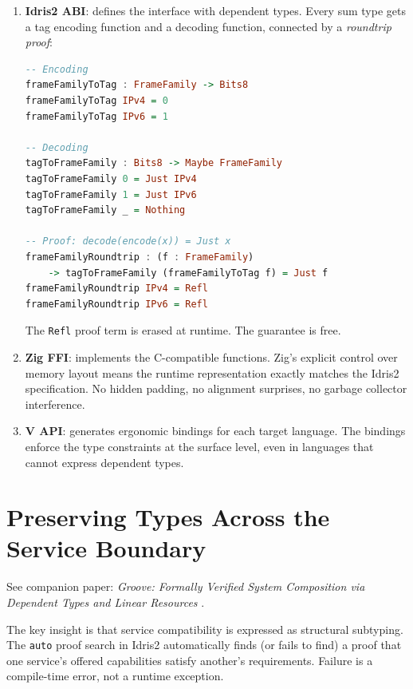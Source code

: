 \documentclass[11pt,a4paper]{article}
\begin{document}
\begin{enumerate}
\item \textbf{Idris2 ABI}: defines the interface with dependent types.
  Every sum type gets a tag encoding function and a decoding function,
  connected by a \emph{roundtrip proof}:

\begin{lstlisting}[language=Haskell]
-- Encoding
frameFamilyToTag : FrameFamily -> Bits8
frameFamilyToTag IPv4 = 0
frameFamilyToTag IPv6 = 1

-- Decoding
tagToFrameFamily : Bits8 -> Maybe FrameFamily
tagToFrameFamily 0 = Just IPv4
tagToFrameFamily 1 = Just IPv6
tagToFrameFamily _ = Nothing

-- Proof: decode(encode(x)) = Just x
frameFamilyRoundtrip : (f : FrameFamily)
    -> tagToFrameFamily (frameFamilyToTag f) = Just f
frameFamilyRoundtrip IPv4 = Refl
frameFamilyRoundtrip IPv6 = Refl
\end{lstlisting}

  The \texttt{Refl} proof term is erased at runtime. The guarantee is
  free.

\item \textbf{Zig FFI}: implements the C-compatible functions. Zig's
  explicit control over memory layout means the runtime representation
  exactly matches the Idris2 specification. No hidden padding, no
  alignment surprises, no garbage collector interference.

\item \textbf{V API}: generates ergonomic bindings for each target
  language. The bindings enforce the type constraints at the surface
  level, even in languages that cannot express dependent types.
\end{enumerate}

\section{Preserving Types Across the Service Boundary}
\label{sec:service}

See companion paper: \emph{Groove: Formally Verified System Composition
via Dependent Types and Linear Resources} \cite{groove2026}.

The key insight is that service compatibility is expressed as structural
subtyping. The \texttt{auto} proof search in Idris2 automatically finds
(or fails to find) a proof that one service's offered capabilities
satisfy another's requirements. Failure is a compile-time error, not a
runtime exception.
\end{document}
